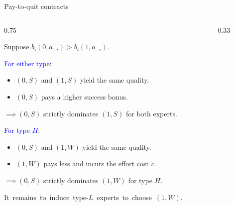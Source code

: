 \documentclass[10pt,aspectratio=169, compressed]{beamer}
\begin{document}
\begin{frame}[t]{Pay-to-quit contracts}

\begin{columns}[T,onlytextwidth]
    \begin{column}{0.75\textwidth}
    
    
    Suppose $b_i(0,a_{-i}) > b_i(1,a_{-i})$.

\bigskip

\textcolor{blue}{For either type}:

\smallskip

\begin{itemize}
\item 	$(0,S)$ and $(1,S)$ yield the same quality.
\item 	 $(0,S)$ pays a higher success bonus.
\end{itemize}

\smallskip

$\implies (0,S)$ strictly dominates $(1,S)$ for both experts.

\bigskip

\textcolor{blue}{For type $H$}:

\begin{itemize}
\item 	 $(0,S)$ and $(1,W)$ yield the same quality.
\item 	$(1,W)$ pays less and incurs the effort cost $c$.
\end{itemize}

\smallskip

$\implies (0,S)$ strictly dominates $(1,W)$ for type $H$.

\bigskip
       
  \mbox{It remains to induce type-$L$ experts to choose $(1,W)$.}
    
    
    \end{column}

       \begin{column}{0.33\textwidth}
        \centering
        \setlength{\tabcolsep}{8pt}
        \renewcommand{\arraystretch}{1.2}
\\[5pt]
\\[15pt]


\end{column}
\end{columns}
\end{frame}
\end{document}

